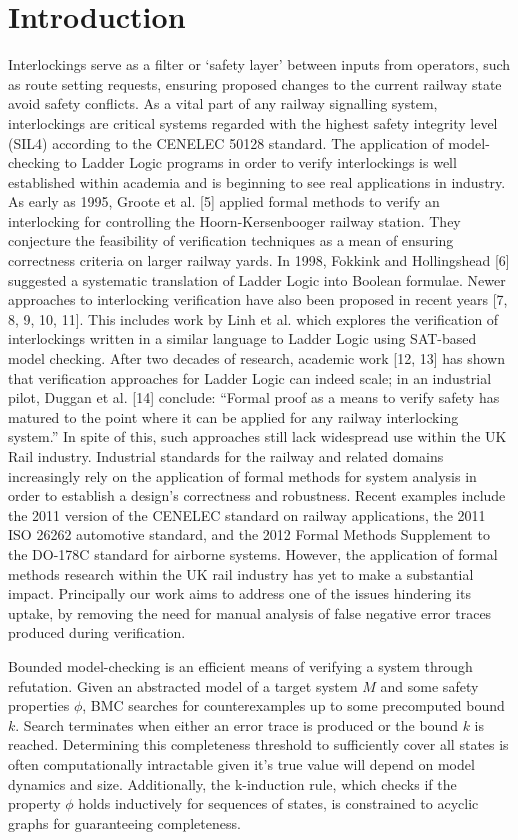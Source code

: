 \documentclass[runningheads]{llncs}
\begin{document}
\section{Introduction}
Interlockings serve as a filter or ‘safety layer’ between inputs from operators, such as route setting requests, ensuring proposed changes to the current railway state avoid safety conflicts. As a vital part of any railway signalling system, interlockings are critical systems regarded with the highest safety integrity level
(SIL4) according to the CENELEC 50128 standard. The application of model-checking
to Ladder Logic programs in order to verify interlockings is well established within
academia and is beginning to see real applications in industry. As early as 1995, Groote
et al. [5] applied formal methods to verify an interlocking for controlling the Hoorn-Kersenbooger railway station. They conjecture the feasibility of verification techniques
as a mean of ensuring correctness criteria on larger railway yards. In 1998, Fokkink
and Hollingshead [6] suggested a systematic translation of Ladder Logic into Boolean
formulae. Newer approaches to interlocking verification have also been proposed in recent
years [7, 8, 9, 10, 11]. This includes work by Linh et al. which explores the verification
of interlockings written in a similar language to Ladder Logic using SAT-based model
checking. After two decades of research, academic work [12, 13] has shown that verification
approaches for Ladder Logic can indeed scale; in an industrial pilot, Duggan et al. [14]
conclude: “Formal proof as a means to verify safety has matured to the point where it
can be applied for any railway interlocking system.” In spite of this, such approaches
still lack widespread use within the UK Rail industry. Industrial standards for the railway and related domains increasingly rely on the application of formal methods for system analysis in order to establish a design’s correctness and robustness. Recent examples include the 2011 version of the CENELEC standard on railway applications, the 2011 ISO 26262 automotive standard, and the 2012 Formal Methods Supplement to the DO-178C standard for airborne systems. However, the application of formal methods research within the UK rail industry has yet to make a substantial impact. Principally our work aims to address one of the issues hindering its uptake, by removing the need for manual analysis of false negative error traces produced during verification.

Bounded model-checking is an efficient means of verifying a system through refutation. Given an abstracted model of a target system $M$ and some safety properties $\phi$, BMC searches for counterexamples up to some precomputed bound $k$. Search terminates when either an error trace is produced or the bound $k$ is reached. Determining this completeness threshold to sufficiently cover all states is often computationally intractable given it's true value will depend on model dynamics and size. Additionally, the k-induction rule, which checks if the property $\phi$ holds inductively for sequences of states, is constrained to acyclic graphs for guaranteeing completeness. 
\end{document}
